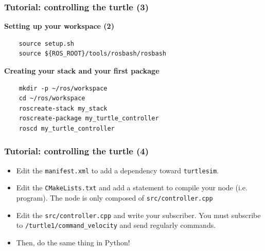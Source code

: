 \documentclass[hyperref={pdfpagelabels=false}]{beamer}
\begin{document}
\begin{frame}[fragile]
  \frametitle{Tutorial: controlling the turtle (3)}

  \textbf{Setting up your workspace (2)}
  \begin{verbatim}
    source setup.sh
    source ${ROS_ROOT}/tools/rosbash/rosbash
  \end{verbatim}

  \textbf{Creating your stack and your first package}
  \begin{verbatim}
    mkdir -p ~/ros/workspace
    cd ~/ros/workspace
    roscreate-stack my_stack
    roscreate-package my_turtle_controller
    roscd my_turtle_controller
  \end{verbatim}
\end{frame}

\begin{frame}[fragile]
  \frametitle{Tutorial: controlling the turtle (4)}

  \begin{itemize}
  \item Edit the \texttt{manifest.xml} to add a dependency toward
    \texttt{turtlesim}.
  \item Edit the \texttt{CMakeLists.txt} and add a statement to
    compile your node (i.e. program). The node is only composed of
    \texttt{src/controller.cpp}
  \item Edit the \texttt{src/controller.cpp} and write your
    subscriber. You must subscribe to
    \texttt{/turtle1/command\_velocity} and send regularly commands.
  \item Then, do the same thing in Python!
  \end{itemize}
\end{frame}
\end{document}
